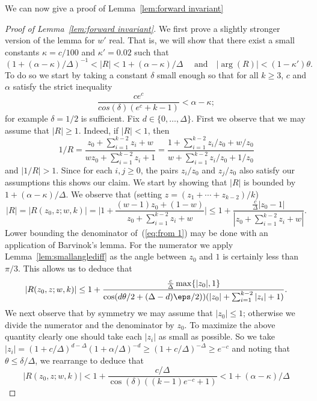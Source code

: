 \noindent
We can now give a proof of Lemma~\ref{lem:forward invariant}
%
\begin{proof}[Proof of Lemma~\ref{lem:forward invariant}]
We first prove a slightly stronger version of the lemma for $w'$ real.
That is, we will show that there exist a small constants $\kappa = c/100$ and $\kappa'=0.02$ such that
\begin{equation}\label{eq:real case}
(1+(\alpha-\kappa)/\Delta)^{-1}<|R|<1+(\alpha-\kappa)/\Delta \quad \text{ and}\quad |\arg(R)|< (1-\kappa')\theta.
\end{equation}
To do so we start by taking a constant $\delta$ small enough so that for all $k \geq 3$, $c$ and $\alpha$ satisfy the strict inequality 
%
\begin{equation}
 \frac{ce^c}{cos(\delta)(e^c+k-1)} < \alpha - \kappa; 
 \label{eq:calphabounds}
\end{equation}
for example $\delta = 1/2$ is sufficient.
%
%
%
Fix $d\in\{0,\ldots,\Delta\}$.
First we observe that we may assume that $|R|\geq 1$. 
Indeed, if $|R|<1$, then 
\[
1/R=\frac{z_0+\sum_{i=1}^{k-2}z_i+w}{wz_0+\sum_{i=1}^{k-2}z_i+1}=\frac{1+\sum_{i=1}^{k-2}z_i/z_0+w/z_0}{w+\sum_{i=1}^{k-2}z_i/z_0+1/z_0}
\]
and $|1/R|>1$.
Since for each $i,j\geq 0$, the pairs $z_i/z_0$ and $z_j/z_0$ also satisfy our assumptions this shows our claim.
We start by showing that $|R|$ is bounded by $1+(\alpha - \kappa)/\Delta$.
%
We observe that (setting $z = (z_1 + \cdots + z_{k-2})/k$)
\begin{equation}\label{eq:from 1}
|R| = |R(z_0,z;w,k)|=\bigg|1+\frac{(w-1)z_0+(1-w)}{z_0+\sum_{i=1}^{k-2}z_i+w}\bigg|\leq 1+\frac{\frac{c}{\Delta}|z_0-1|}{|z_0+\sum_{i=1}^{k-2}z_i+w|}.
\end{equation}
Lower bounding the denominator of~(\ref{eq:from 1}) may be done with an application of Barvinok's lemma.
For the numerator we apply Lemma~\ref{lem:smallanglediff} as the angle between $z_0$ and $1$ is certainly less than $\pi/3$. 
This allows us to deduce that
\[
 |R(z_0,z;w,k)| \leq 1 +\frac{\frac{c}{\Delta} \max\{|z_0|,1\}}{\cos(d\theta/2+(\Delta-d)\eps/2))(|z_0|+\sum_{i=1}^{k-2}|z_i|+1)}.
\]
We next observe that by symmetry we may assume that $|z_0|\leq 1$; otherwise we divide the numerator and the denominator by $z_0$.
To maximize the above quantity clearly one should take each $|z_i|$ as small as possible. 
So we take $|z_i| = (1+c/\Delta)^{d-\Delta}(1+\alpha/\Delta)^{-d} \geq (1+c/\Delta)^{-\Delta} \geq e^{-c}$ and noting that $\theta\leq \delta/\Delta$, we rearrange to deduce that 
\[
|R(z_0,z;w,k)| < 1+\frac{c / \Delta}{\cos(\delta)((k-1)e^{-c}+1)}< 1+(\alpha-\kappa)/\Delta
\]
\end{proof}
